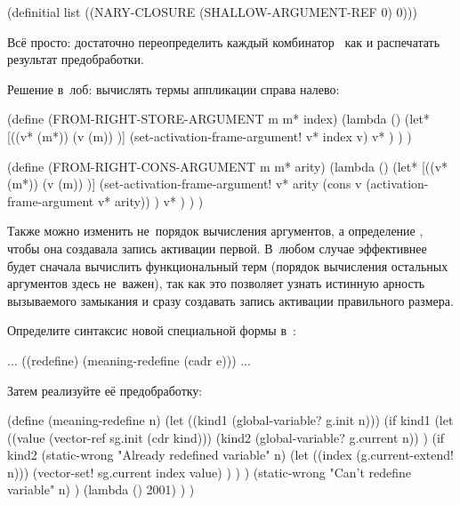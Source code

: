 \begin{code:lisp}
(definitial list ((NARY-CLOSURE (SHALLOW-ARGUMENT-REF 0) 0)))
\end{code:lisp}



Всё просто: достаточно переопределить каждый комбинатор~ как  и распечатать результат предобработки.



Решение в~лоб: вычислять термы аппликации справа налево:

\begin{code:lisp}
(define (FROM-RIGHT-STORE-ARGUMENT m m* index)
  (lambda ()
    (let* [((v* (m*))
           (v  (m)) )]
      (set-activation-frame-argument! v* index v)
      v* ) ) )

(define (FROM-RIGHT-CONS-ARGUMENT m m* arity)
  (lambda ()
    (let* [((v* (m*))
           (v  (m)) )]
      (set-activation-frame-argument!
       v* arity (cons v (activation-frame-argument v* arity)) )
      v* ) ) )
\end{code:lisp}

Также можно изменить не~порядок вычисления аргументов, а определение
, чтобы она создавала запись активации первой. В~любом случае
эффективнее будет сначала вычислить функциональный терм (порядок вычисления
остальных аргументов здесь не~важен), так как это позволяет узнать истинную
арность вызываемого замыкания и сразу создавать запись активации правильного
размера.



Определите синтаксис новой специальной формы в~:

\begin{code:lisp}
... ((redefine) (meaning-redefine (cadr e))) ...
\end{code:lisp}

\noindent
Затем реализуйте её предобработку:

\begin{code:lisp}
(define (meaning-redefine n)
  (let ((kind1 (global-variable? g.init n)))
    (if kind1
        (let ((value (vector-ref sg.init (cdr kind)))
              (kind2 (global-variable? g.current n)) )
          (if kind2
              (static-wrong "Already redefined variable" n)
              (let ((index (g.current-extend! n)))
                (vector-set! sg.current index value) ) ) )
        (static-wrong "Can't redefine variable" n) )
    (lambda () 2001) ) )
\end{code:lisp}

